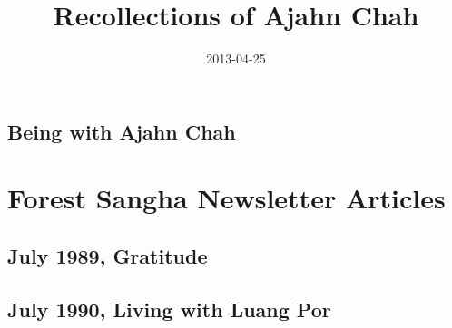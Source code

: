 \documentclass[
  pagePreset=smallpage,
  babelLanguage=british,
]{aruno-anecdote}
\title{Recollections of Ajahn Chah}
\subtitle{}
\author{}
\date{2013-04-25}
\begin{document}

\frontmatter


\cleartorecto
\thispagestyle{empty}



\cleartoverso
\thispagestyle{empty}



\cleartorecto
\thispagestyle{empty}



\tableofcontents


\mainmatter

\part{\space}

\chapter{Being with Ajahn Chah}



\part{Forest Sangha Newsletter Articles}

\chapter[July 1989, Gratitude to Ajahn Chah]{July 1989, Gratitude\newline {}}


\chapter{July 1990, Living with Luang Por}

\end{document}
